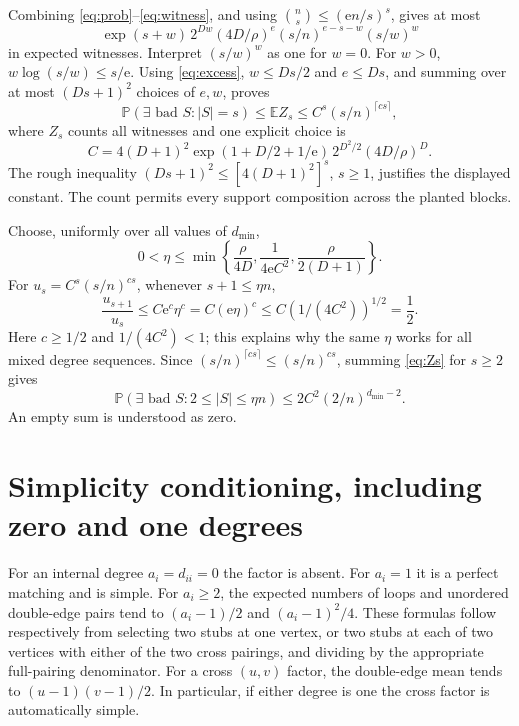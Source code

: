 \documentclass[11pt]{article}
\newcommand{\Prob}{\mathbb P}
\newcommand{\E}{\mathbb E}
\begin{document}
Combining \eqref{eq:prob}--\eqref{eq:witness}, and using
$\binom ns\le(\mathrm e n/s)^s$, gives at most
\[
 \exp(s+w)\,2^{Dw}(4D/\rho)^e
       (s/n)^{e-s-w}(s/w)^w
\]
in expected witnesses. Interpret $(s/w)^w$ as one for $w=0$.
For $w>0$, $w\log(s/w)\le s/\mathrm e$. Using
\eqref{eq:excess}, $w\le Ds/2$ and $e\le Ds$, and summing over
at most $(Ds+1)^2$ choices of $e,w$, proves
\begin{equation}\label{eq:Zs}
 \Prob(\exists\text{ bad }S:|S|=s)
 \le \E Z_s\le C^s(s/n)^{\lceil cs\rceil},
\end{equation}
where $Z_s$ counts all witnesses and one explicit choice is
\[
 C=4(D+1)^2
 \exp(1+D/2+1/\mathrm e)\,2^{D^2/2}(4D/\rho)^D.
\]
The rough inequality $(Ds+1)^2\le[4(D+1)^2]^s$, $s\ge1$, justifies
the displayed constant. The count permits every support composition
across the planted blocks.

Choose, uniformly over all values of $d_{\min}$,
\begin{equation}\label{eq:eta}
 0<\eta\le\min\left\{
    \frac\rho{4D},\frac1{4\mathrm e C^2},
    \frac\rho{2(D+1)}\right\}.
\end{equation}
For $u_s=C^s(s/n)^{cs}$, whenever $s+1\le\eta n$,
\[
 \frac{u_{s+1}}{u_s}
 \le C\mathrm e^c\eta^c=C(\mathrm e\eta)^c
 \le C(1/(4C^2))^{1/2}=\frac12.
\]
Here $c\ge1/2$ and $1/(4C^2)<1$; this explains why the same $\eta$
works for all mixed degree sequences. Since $(s/n)^{\lceil cs\rceil}
\le(s/n)^{cs}$, summing \eqref{eq:Zs} for $s\ge2$ gives
\begin{equation}\label{eq:config-tail}
 \Prob(\exists\text{ bad }S:2\le|S|\le\eta n)
 \le2C^2(2/n)^{d_{\min}-2}.
\end{equation}
An empty sum is understood as zero.

\section{Simplicity conditioning, including zero and one degrees}
For an internal degree $a_i=d_{ii}=0$ the factor is absent. For
$a_i=1$ it is a perfect matching and is simple. For $a_i\ge2$, the
expected numbers of loops and unordered double-edge pairs tend to
$(a_i-1)/2$ and $(a_i-1)^2/4$. These formulas follow respectively
from selecting two stubs at one vertex, or two stubs at each of two
vertices with either of the two cross pairings, and dividing by the
appropriate full-pairing denominator. For a cross $(u,v)$ factor,
the double-edge mean tends to $(u-1)(v-1)/2$. In particular, if
either degree is one the cross factor is automatically simple.
\end{document}

